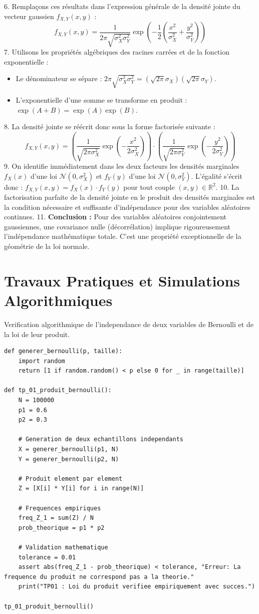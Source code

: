 \documentclass[11pt,a4paper]{article}
\begin{document}
6. Remplaçons ces résultats dans l'expression générale de la densité jointe du vecteur gaussien $f_{X,Y}(x,y)$ :
   $$ f_{X,Y}(x,y) = \frac{1}{2\pi \sqrt{\sigma_X^2 \sigma_Y^2}} \exp\left(-\frac{1}{2} \left( \frac{x^2}{\sigma_X^2} + \frac{y^2}{\sigma_Y^2} \right) \right) $$
7. Utilisons les propriétés algébriques des racines carrées et de la fonction exponentielle :
\begin{itemize}
\item Le dénominateur se sépare : $2\pi \sqrt{\sigma_X^2 \sigma_Y^2} = (\sqrt{2\pi} \sigma_X) (\sqrt{2\pi} \sigma_Y)$.
\item L'exponentielle d'une somme se transforme en produit : $\exp(A + B) = \exp(A)\exp(B)$.
\end{itemize}8. La densité jointe se réécrit donc sous la forme factorisée suivante :
   $$ f_{X,Y}(x,y) = \left( \frac{1}{\sqrt{2\pi \sigma_X^2}} \exp\left(-\frac{x^2}{2\sigma_X^2}\right) \right) \cdot \left( \frac{1}{\sqrt{2\pi \sigma_Y^2}} \exp\left(-\frac{y^2}{2\sigma_Y^2}\right) \right) $$
9. On identifie immédiatement dans les deux facteurs les densités marginales $f_X(x)$ d'une loi $\mathcal{N}(0, \sigma_X^2)$ et $f_Y(y)$ d'une loi $\mathcal{N}(0, \sigma_Y^2)$.
   L'égalité s'écrit donc : $f_{X,Y}(x,y) = f_X(x) \cdot f_Y(y)$ pour tout couple $(x,y) \in \mathbb{R}^2$.
10. La factorisation parfaite de la densité jointe en le produit des densités marginales est la condition nécessaire et suffisante d'indépendance pour des variables aléatoires continues.
11. \textbf{Conclusion :} Pour des variables aléatoires conjointement gaussiennes, une covariance nulle (décorrélation) implique rigoureusement l'indépendance mathématique totale. C'est une propriété exceptionnelle de la géométrie de la loi normale.




\newpage
\part{Travaux Pratiques et Simulations Algorithmiques}
Verification algorithmique de l'independance de deux variables de Bernoulli et de la loi de leur produit.
\begin{lstlisting}
def generer_bernoulli(p, taille):
    import random
    return [1 if random.random() < p else 0 for _ in range(taille)]

def tp_01_produit_bernoulli():
    N = 100000
    p1 = 0.6
    p2 = 0.3

    # Generation de deux echantillons independants
    X = generer_bernoulli(p1, N)
    Y = generer_bernoulli(p2, N)

    # Produit element par element
    Z = [X[i] * Y[i] for i in range(N)]

    # Frequences empiriques
    freq_Z_1 = sum(Z) / N
    prob_theorique = p1 * p2

    # Validation mathematique
    tolerance = 0.01
    assert abs(freq_Z_1 - prob_theorique) < tolerance, "Erreur: La frequence du produit ne correspond pas a la theorie."
    print("TP01 : Loi du produit verifiee empiriquement avec succes.")

tp_01_produit_bernoulli()
\end{lstlisting}
\end{document}
